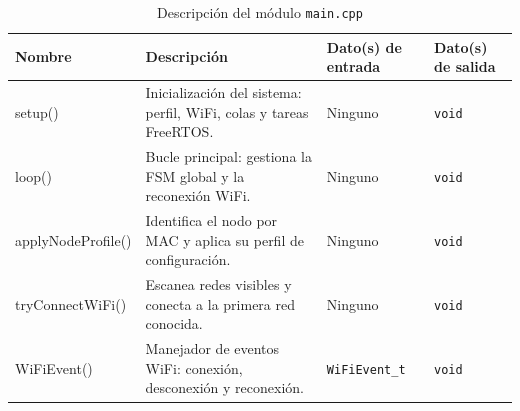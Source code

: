 \begin{table}[h!]
\begin{tabular}{|p{2.8cm}|p{5.5cm}|p{2.8cm}|p{1.7cm}|}
\hline
\textbf{Nombre} & \textbf{Descripción} & \textbf{Dato(s) de entrada} & \textbf{Dato(s) de salida} \\
\hline
setup() & Inicialización del sistema: perfil, WiFi, colas y tareas FreeRTOS. & Ninguno & \texttt{void} \\
\hline
loop() & Bucle principal: gestiona la FSM global y la reconexión WiFi. & Ninguno & \texttt{void} \\
\hline
applyNodeProfile() & Identifica el nodo por MAC y aplica su perfil de configuración. & Ninguno & \texttt{void} \\
\hline
tryConnectWiFi() & Escanea redes visibles y conecta a la primera red conocida. & Ninguno & \texttt{void} \\
\hline
WiFiEvent() & Manejador de eventos WiFi: conexión, desconexión y reconexión. & \texttt{WiFiEvent\_t} & \texttt{void} \\
\hline
\end{tabular}
\caption{Descripción del módulo \texttt{main.cpp}}
\label{tab:module_main}
\end{table}



